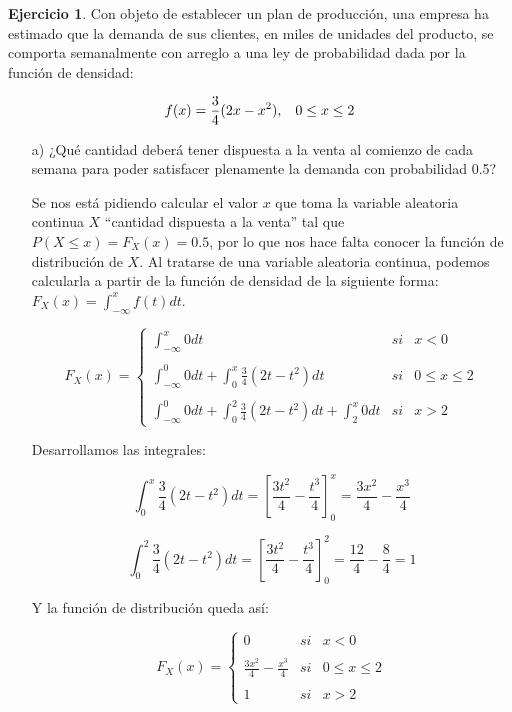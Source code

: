 \documentclass[a4paper, 12pt]{article}
\theoremstyle{definition}
\newtheorem{ej}{Ejercicio}
\begin{document}
\begin{ej}
Con objeto de establecer un plan de producción, una empresa ha estimado que la demanda de
sus clientes, en miles de unidades del producto, se comporta semanalmente con arreglo a una
ley de probabilidad dada por la función de densidad:

\[
f(x)=\frac{3}{4} (2x-x^2), \hspace{0.3cm} 0 \leq x \leq 2
\]

\begin{enumerate}
    \item[a)] ¿Qué cantidad deberá tener dispuesta a la venta al comienzo de cada semana para poder satisfacer plenamente la demanda con probabilidad 0.5?
    
    Se nos está pidiendo calcular el valor $x$ que toma la variable aleatoria continua $X$ ``cantidad dispuesta a la venta'' tal que $P(X\leq x) = F_{X}(x) = 0.5$, por lo que nos hace falta conocer la función de distribución de $X$. Al tratarse de una variable aleatoria continua, podemos calcularla a partir de la función de densidad de la siguiente forma: $F_{X}(x) = \int_{-\infty}^{x}f(t)dt$.
    
    \[
    F_{X}(x) = \left\{ \begin{array}{lcc}
             \int_{-\infty}^{x}0dt &   si  & x < 0 \\
             \\ \int_{-\infty}^{0}0dt + \int_{0}^{x}\frac{3}{4} (2t-t^2)dt &  si & 0 \leq x \leq 2 \\
             \\ \int_{-\infty}^{0}0dt + \int_{0}^{2}\frac{3}{4} (2t-t^2)dt + \int_{2}^{x}0dt &  si  & x > 2
             \end{array}
   \right.
    \]
    
    Desarrollamos las integrales:
    
    \[
    \int_{0}^{x}\frac{3}{4} (2t-t^2)dt = \left[\frac{3t^2}{4}-\frac{t^3}{4}\right]^{x}_{0} = \frac{3x^2}{4}-\frac{x^3}{4}
    \]
    
    \[
    \int_{0}^{2}\frac{3}{4} (2t-t^2)dt = \left[\frac{3t^2}{4}-\frac{t^3}{4}\right]^{2}_{0} = \frac{12}{4}-\frac{8}{4}=1
    \]
    
    Y la función de distribución queda así:
    
    \[
    F_{X}(x) = \left\{ \begin{array}{lcc}
             0 &   si  & x < 0 \\
             \\ \frac{3x^2}{4}-\frac{x^3}{4} &  si & 0 \leq x \leq 2 \\
             \\ 1 &  si  & x > 2
             \end{array}
   \right.
    \]
    

\end{enumerate}
\end{ej}
\end{document}
